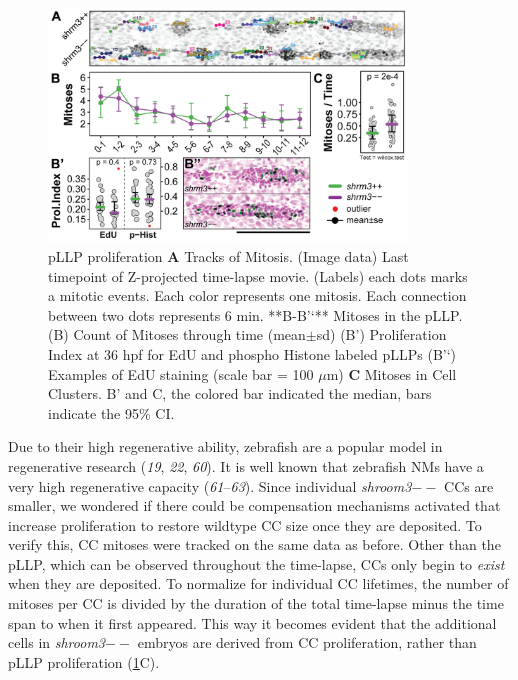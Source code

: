 \documentclass[11pt,singlespacinge,twoside]{reedthesis} %
\begin{document}
\begin{figure}

{\centering \includegraphics[width=0.85\textwidth]{figures/results/02_proliferation/prol-01} 

}

\caption[pLLP proliferation]{pLLP proliferation \textbf{A} Tracks of Mitosis. (Image data) Last timepoint of Z-projected time-lapse movie. (Labels) each dots marks a mitotic events. Each color represents one mitosis. Each connection between two dots represents 6 min. **B-B'`** Mitoses in the pLLP. (B) Count of Mitoses through time (mean\(\pm\)sd) (B') Proliferation Index at 36 hpf for EdU and phospho Histone labeled pLLPs (B'`) Examples of EdU staining (scale bar = 100 \(\mu\)m) \textbf{C} Mitoses in Cell Clusters. B' and C, the colored bar indicated the median, bars indicate the 95\% CI.}\label{fig:prolpllp}
\end{figure}
Due to their high regenerative ability, zebrafish are a popular model in regenerative research (\emph{19}, \emph{22}, \emph{60}). It is well known that zebrafish NMs have a very high regenerative capacity (\emph{61}--\emph{63}). Since individual \emph{shroom3}\(--\) CCs are smaller, we wondered if there could be compensation mechanisms activated that increase proliferation to restore wildtype CC size once they are deposited. To verify this, CC mitoses were tracked on the same data as before. Other than the pLLP, which can be observed throughout the time-lapse, CCs only begin to \emph{exist} when they are deposited. To normalize for individual CC lifetimes, the number of mitoses per CC is divided by the duration of the total time-lapse minus the time span to when it first appeared. This way it becomes evident that the additional cells in \emph{shroom3}\(--\) embryos are derived from CC proliferation, rather than pLLP proliferation (\ref{fig:prolpllp}C).
\end{document}
